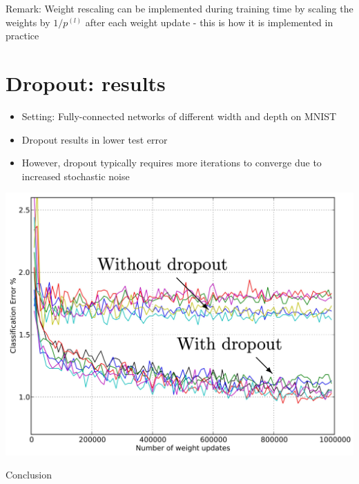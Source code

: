 \documentclass[10pt]{article}
\begin{document}
Remark: Weight rescaling can be implemented during training time by scaling the weights by $1 / p^{(l)}$ after each weight update - this is how it is implemented in practice

\section*{Dropout: results}
\begin{itemize}
  \item Setting: Fully-connected networks of different width and depth on MNIST

  \item Dropout results in lower test error

  \item However, dropout typically requires more iterations to converge due to increased stochastic noise

\end{itemize}

\begin{center}
\includegraphics[max width=\textwidth]{2024_01_08_959e2db67a31f073f6d2g-32}
\end{center}

Conclusion
\end{document}
